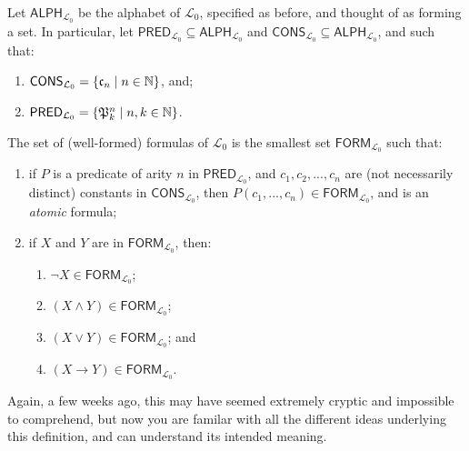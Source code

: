\begin{defn} \label{language}
Let $\mathsf{ALPH}_{\mathcal{L}_0}$ be the alphabet of $\mathcal{L}_0$, specified as before, and thought of as forming a set. In particular, let $\mathsf{PRED}_{\mathcal{L}_0} \subseteq \mathsf{ALPH}_{\mathcal{L}_0}$ and $\mathsf{CONS}_{\mathcal{L}_0} \subseteq \mathsf{ALPH}_{\mathcal{L}_0}$, and such that:

\begin{enumerate}
	\item $\mathsf{CONS}_{\mathcal{L}_0}=\{\mathfrak{c}_{n} \mid n \in \mathbb{N}\}$, and;
	\item $\mathsf{PRED}_{\mathcal{L}_0}=\{\mathfrak{P}^{n}_{k} \mid n, k \in \mathbb{N}\}$.
\end{enumerate}

The set of (well-formed) formulas of $\mathcal{L}_0$ is the smallest set $\mathsf{FORM}_{\mathcal{L}_0}$ such that:
%
\begin{enumerate}
	\item if $P$ is a predicate of arity $n$ in $\mathsf{PRED}_{\mathcal{L}_0}$, and $c_1, c_2, ..., c_n$ are (not necessarily distinct) constants in $\mathsf{CONS}_{\mathcal{L}_0}$, then $P(c_1, ..., c_n) \in \mathsf{FORM}_{\mathcal{L}_0}$, and is an \textit{atomic} formula;
	\item if $X$ and $Y$ are in $\mathsf{FORM}_{\mathcal{L}_0}$, then:
		\begin{enumerate}
		\item $\neg X \in \mathsf{FORM}_{\mathcal{L}_0}$;
		\item $(X \wedge Y) \in \mathsf{FORM}_{\mathcal{L}_0}$;
		\item $(X \vee Y) \in \mathsf{FORM}_{\mathcal{L}_0}$; and
		\item $(X \rightarrow Y) \in \mathsf{FORM}_{\mathcal{L}_0}$.
		\end{enumerate}
\end{enumerate}
\end{defn}

Again, a few weeks ago, this may have seemed extremely cryptic and impossible to comprehend, but now you are familar with all the different ideas underlying this definition, and can understand its intended meaning. 


